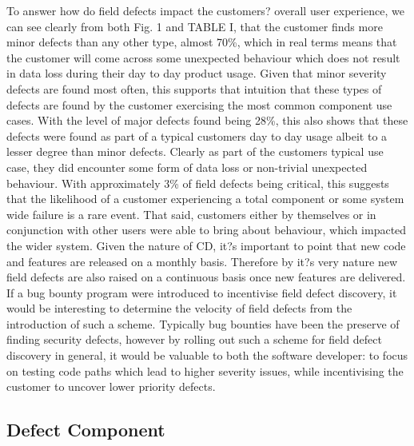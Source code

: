\documentclass[conference]{IEEEtran}
\begin{document}
To answer how do field defects impact the customers? overall user experience, we can see clearly from both Fig. 1 and TABLE I, that the customer finds more minor defects than any other type, almost 70\%, which in real terms means that the customer will come across some unexpected behaviour which does not result in data loss during their day to day product usage. Given that minor severity defects are found most often, this supports that intuition that these types of defects are found by the customer exercising the most common component use cases. With the level of major defects found being 28\%, this also shows that these defects were found as part of a typical customers day to day usage albeit to a lesser degree than minor defects. Clearly as part of the customers typical use case, they did encounter some form of data loss or non-trivial unexpected behaviour. With approximately 3\% of field defects being critical, this suggests that the likelihood of a customer experiencing a total component or some system wide failure is a rare event. That said, customers either by themselves or in conjunction with other users were able to bring about behaviour, which impacted the wider system.
Given the nature of CD, it?s important to point that new code and features are released on a monthly basis. Therefore by it?s very nature new field defects are also raised on a continuous basis once new features are delivered. If a bug bounty program were introduced to incentivise field defect discovery, it would be interesting to determine the velocity of field defects from the introduction of such a scheme. Typically bug bounties have been the preserve of finding security defects, however by rolling out such a scheme for field defect discovery in general, it would be valuable to both the software developer: to focus on testing code paths which lead to higher severity issues, while incentivising the customer to uncover lower priority defects.

\subsection{Defect Component}
\end{document}
